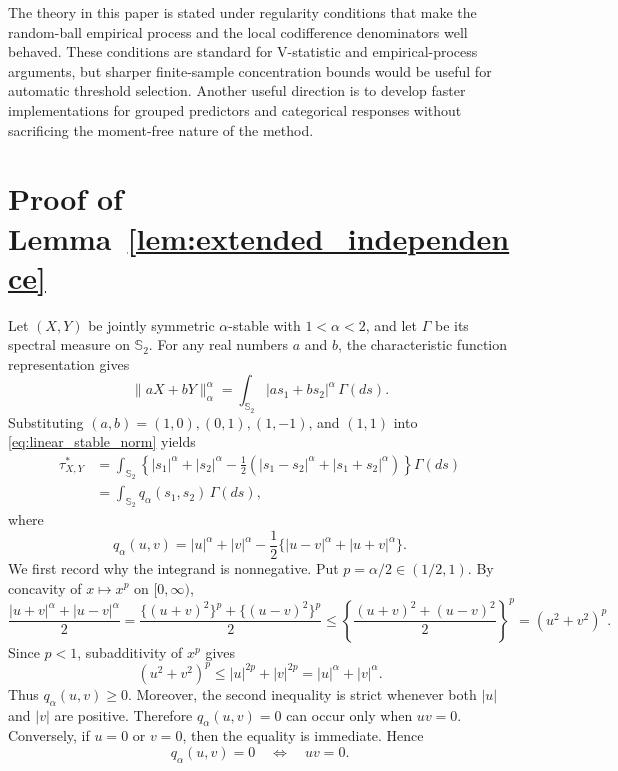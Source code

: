\documentclass[11pt]{article}
\theoremstyle{definition}
\newcommand{\Sph}{\mathbb{S}}
\begin{document}
The theory in this paper is stated under regularity conditions that make the random-ball empirical process and the local codifference denominators well behaved.  These conditions are standard for V-statistic and empirical-process arguments, but sharper finite-sample concentration bounds would be useful for automatic threshold selection.  Another useful direction is to develop faster implementations for grouped predictors and categorical responses without sacrificing the moment-free nature of the method.


\appendix

\section{Proof of Lemma~\ref{lem:extended_independence}}\label{app:proof_extended}

Let \((X,Y)\) be jointly symmetric \(\alpha\)-stable with \(1<\alpha<2\), and let \(\Gamma\) be its spectral measure on \(\Sph_2\).  For any real numbers \(a\) and \(b\), the characteristic function representation gives
\begin{equation}\label{eq:linear_stable_norm}
\|aX+bY\|_\alpha^\alpha
=\int_{\Sph_2}|as_1+bs_2|^\alpha\,\Gamma(ds).
\end{equation}
Substituting \((a,b)=(1,0),(0,1),(1,-1)\), and \((1,1)\) into \eqref{eq:linear_stable_norm} yields
\begin{align*}
\tau^*_{X,Y}
&=\int_{\Sph_2}\left\{|s_1|^\alpha+|s_2|^\alpha
-\frac{1}{2}\left(|s_1-s_2|^\alpha+|s_1+s_2|^\alpha\right)\right\}\Gamma(ds)  \\
&=\int_{\Sph_2} q_\alpha(s_1,s_2)\,\Gamma(ds),
\end{align*}
where
\[
q_\alpha(u,v)=|u|^\alpha+|v|^\alpha
-\frac{1}{2}\{|u-v|^\alpha+|u+v|^\alpha\}.
\]
We first record why the integrand is nonnegative.  Put \(p=\alpha/2\in(1/2,1)\).  By concavity of \(x\mapsto x^p\) on \([0,\infty)\),
\[
\frac{|u+v|^\alpha+|u-v|^\alpha}{2}
=\frac{\{(u+v)^2\}^{p}+\{(u-v)^2\}^{p}}{2}
\leq\left\{\frac{(u+v)^2+(u-v)^2}{2}\right\}^{p}
=(u^2+v^2)^p .
\]
Since \(p<1\), subadditivity of \(x^p\) gives
\[
(u^2+v^2)^p\leq |u|^{2p}+|v|^{2p}=|u|^\alpha+|v|^\alpha.
\]
Thus \(q_\alpha(u,v)\ge0\).  Moreover, the second inequality is strict whenever both \(|u|\) and \(|v|\) are positive.  Therefore \(q_\alpha(u,v)=0\) can occur only when \(uv=0\).  Conversely, if \(u=0\) or \(v=0\), then the equality is immediate.  Hence
\begin{equation}\label{eq:q_zero_axes}
q_\alpha(u,v)=0 \quad\Longleftrightarrow\quad uv=0.
\end{equation}
\end{document}
